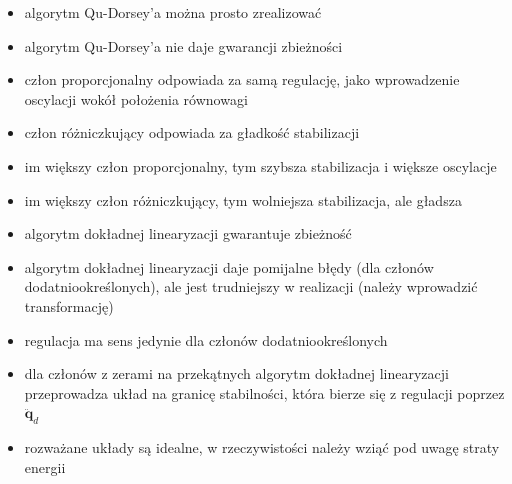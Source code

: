 \documentclass[12pt,a4paper]{article}
\newcommand{\mb}[1]{\mathbf{#1}}
\begin{document}
\begin{itemize}
    \item algorytm Qu-Dorsey'a można prosto zrealizować
    \item algorytm Qu-Dorsey'a nie daje gwarancji zbieżności
    \item człon proporcjonalny odpowiada za samą regulację, jako wprowadzenie oscylacji wokół położenia równowagi
    \item człon różniczkujący odpowiada za gładkość stabilizacji
    \item im większy człon proporcjonalny, tym szybsza stabilizacja i większe oscylacje
    \item im większy człon różniczkujący, tym wolniejsza stabilizacja, ale gładsza
    \item algorytm dokładnej linearyzacji gwarantuje zbieżność
    \item algorytm dokładnej linearyzacji daje pomijalne błędy (dla członów dodatniookreślonych), ale jest trudniejszy w realizacji (należy wprowadzić transformację)
    \item regulacja ma sens jedynie dla członów dodatniookreślonych
    \item dla członów z zerami na przekątnych algorytm dokładnej linearyzacji przeprowadza układ na granicę stabilności, która bierze się z regulacji poprzez $\ddot{\mb{q}}_d$
    \item rozważane układy są idealne, w rzeczywistości należy wziąć pod uwagę straty energii
\end{itemize}



\end{document}
